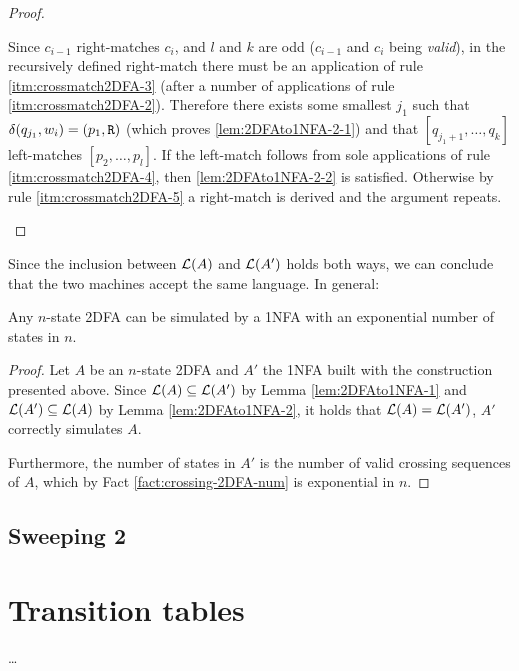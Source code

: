 \begin{proof}
\begin{description}
			Since $c_{i-1}$ right-matches $c_i$, and $l$ and $k$ are odd ($c_{i-1}$ and $c_i$ being \emph{valid}), in the recursively defined right-match there must be an application of rule \ref{itm:crossmatch2DFA-3} (after a number of applications of rule \ref{itm:crossmatch2DFA-2}).
			Therefore there exists some smallest $j_1$ such that $\delta(q_{j_1},w_i)=(p_1,\mathtt R)$ (which proves \ref{lem:2DFAto1NFA-2-1}) and that $[q_{j_1+1},\dots,q_k]$ left-matches $[p_2,\dots,p_l]$.
			If the left-match follows from sole applications of rule \ref{itm:crossmatch2DFA-4}, then \ref{lem:2DFAto1NFA-2-2} is satisfied.
			Otherwise by rule \ref{itm:crossmatch2DFA-5} a right-match is derived and the argument repeats. \qedhere
	\end{description}
\end{proof}

Since the inclusion between $\mathcal L(A)$ and $\mathcal L(A')$ holds both ways, we can conclude that the two machines accept the same language.
In general:
\begin{thrm}\label{thm:2DFAto1NFA}
	Any $n$-state 2DFA can be simulated by a 1NFA with an exponential number of states in $n$.
\end{thrm}
\begin{proof}
	Let $A$ be an $n$-state 2DFA and $A'$ the 1NFA built with the construction presented above.
	Since $\mathcal L(A)\subseteq\mathcal L(A')$ by Lemma \ref{lem:2DFAto1NFA-1} and $\mathcal L(A')\subseteq\mathcal L(A)$ by Lemma \ref{lem:2DFAto1NFA-2}, it holds that $\mathcal L(A)=\mathcal L(A')$, \ie $A'$ correctly simulates $A$.

	Furthermore, the number of states in $A'$ is the number of valid crossing sequences of $A$, which by Fact \ref{fact:crossing-2DFA-num} is exponential in $n$.
\end{proof}



\subsection{Sweeping 2\DFAs{}}



\section{Transition tables}
\dots
